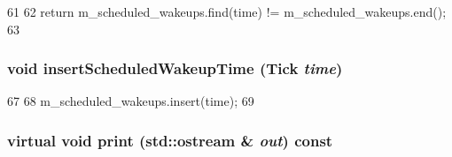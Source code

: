 \begin{DoxyCode}
61     {
62         return m_scheduled_wakeups.find(time) != m_scheduled_wakeups.end();
63     }
\end{DoxyCode}
\hypertarget{classConsumer_a18f41a3442b6485c6e07f2d0440cf659}{
\subsubsection[{insertScheduledWakeupTime}]{\setlength{\rightskip}{0pt plus 5cm}void insertScheduledWakeupTime ({\bf Tick} {\em time})}}
\label{classConsumer_a18f41a3442b6485c6e07f2d0440cf659}



\begin{DoxyCode}
67     {
68         m_scheduled_wakeups.insert(time);
69     }
\end{DoxyCode}
\hypertarget{classConsumer_a3ea5f7af5db62cc24f4e40df9ea5c971}{
\subsubsection[{print}]{\setlength{\rightskip}{0pt plus 5cm}virtual void print (std::ostream \& {\em out}) const}}
\label{classConsumer_a3ea5f7af5db62cc24f4e40df9ea5c971}


